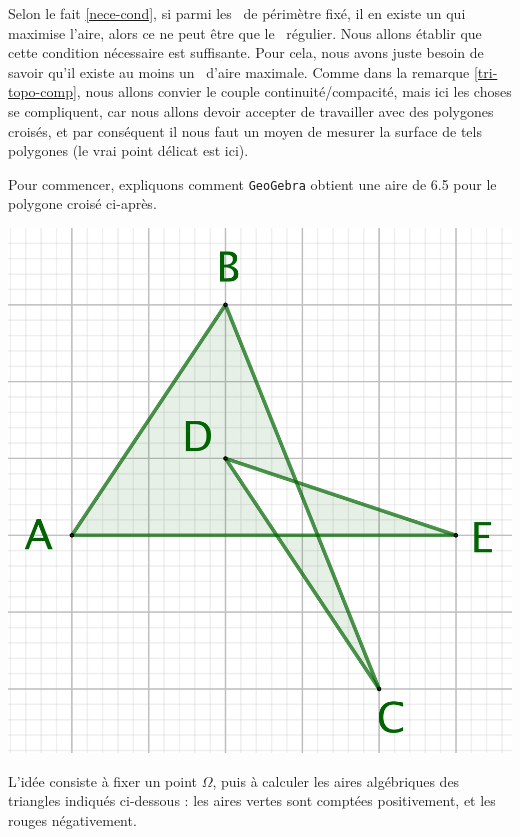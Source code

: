 Selon le fait \ref{nece-cond}, si parmi les \ngones\ de périmètre fixé, il en existe un qui maximise l'aire, alors ce ne peut être que le \ngone\ régulier. Nous allons établir que cette condition nécessaire est suffisante. Pour cela, nous avons juste besoin de savoir qu'il existe au moins un \ngone\ d'aire maximale.
Comme dans la remarque \ref{tri-topo-comp}, nous allons convier le couple continuité/compacité, mais ici les choses se compliquent, car nous allons devoir accepter de travailler avec des polygones croisés, et par conséquent il nous faut un moyen de mesurer la surface de tels polygones (le vrai point délicat est ici). 

\medskip




Pour commencer, expliquons comment \texttt{GeoGebra} obtient une aire de \num{6.5} pour le polygone croisé ci-après.


\begin{center}
	\includegraphics[scale=.4]{content/polygon/sufficient-cond/alg-surf-why.png}
\end{center}


\medskip

L'idée consiste à fixer un point $\Omega$, puis à calculer les aires algébriques des triangles indiqués ci-dessous : les aires vertes sont comptées positivement, et les rouges négativement.

